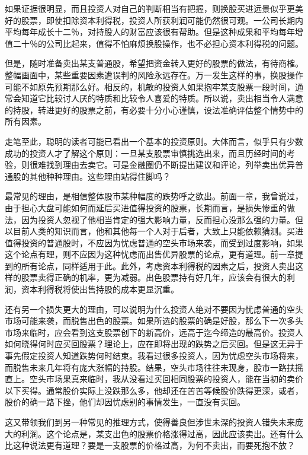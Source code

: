 \documentclass[UTF8,a4paper,zihao=-4,fontset = windows]{ctexart} %
\begin{document}
如果证据很明显，而且投资人对自己的判断相当有把握，则换股买进远景似乎更美好的股票，即使扣除资本利得税，投资人所获利润可能仍然很可观。一公司长期内平均每年成长十二％，对持股人的财富应该很有帮助。但是这种成果和平均每年增值二十％的公司比起来，值得不怕麻烦换股操作，也不必担心资本利得税的问题。

但是，随时准备卖出某支普通股，希望把资金转入更好的股票的做法，有待商榷。整幅画面中，某些重要因素遭误判的风险永远存在。万一发生这样的事，换股操作可能不如原先预期那么好。相反的，机敏的投资人如果抱牢某支股票一段时间，通常会知道它比较讨人厌的特质和比较令人喜爱的特质。所以说，卖出相当令人满意的持股，转进更好的股票之前，有必要十分小心谨慎，设法准确评估整个情势中的所有因素。

走笔至此，聪明的读者可能已看出一个基本的投资原则。大体而言，似乎只有少数成功的投资人才了解这个原则：一旦某支股票审慎挑选出来，而且历经时间的考验，则很难找到理由去卖它。可是金融圈仍不断提出建议和评论，列举卖出优异普通股的其他种种理由。这些理由站得住脚吗？

最常见的理由，是相信整体股市某种幅度的跌势呼之欲出。前面一章，我曾说过，由于担心大盘可能如何而延后买进值得投资的股票，长期而言，是损失惨重的做法，因为投资人忽视了他相当肯定的强大影响力量，反而担心没那么强的力量。但以目前人类的知识而言，他和其他每一个人对于后者，大致上只能依赖猜测。买进值得投资的普通股时，不应因为忧虑普通的空头市场来袭，而受到过度影响，如果这个论点有理，则不应因为这种忧虑而出售优异股票的论点，更有道理。前一章提到的所有论点，同样适用于此。此外，考虑资本利得税的因素之后，投资人卖出这样的股票卖得正确的机率，更为减弱。出色股票持有好几年，应该会有很大的利润，资本利得税将使出售持股的成本更显沉重。

还有另一个损失更大的理由，可以说明为什么投资人绝对不要因为忧虑普通的空头市场可能来袭，而脱售出色的股票。如果所选的股票的确是好股，那么下一次多头市场来临时，应会看到这支股票创下的新高价，远高于迄今缔造的最高价。投资人如何晓得何时应买回股票？理论上，应在即将出现的跌势之后买回。但是这无异于事先假定投资人知道跌势何时结束。我看过很多投资人，因为忧虑空头市场将来，而脱售未来几年将有庞大涨幅的持股。结果，空头市场往往未现身，股市一路扶摇直上。空头市场果真来临时，我从没看过买回相同股票的投资人，能在当初的卖价以下买得。通常股价实际上没跌那么多，他却还在苦苦等候股价跌得更深，或者，股价的确一路下挫，他们却因忧虑别的事情发生，一直没有买回。

这又带领我们到另一种常见的推理方式，使得善良但涉世未深的投资人错失未来庞大的利润。这个论点是，某支出色的股票价格涨得过高，因此应该卖出。还有什么比这种说法更有道理？要是一支股票的价格过高，为何不卖出，而要死抱不放？
\end{document}
